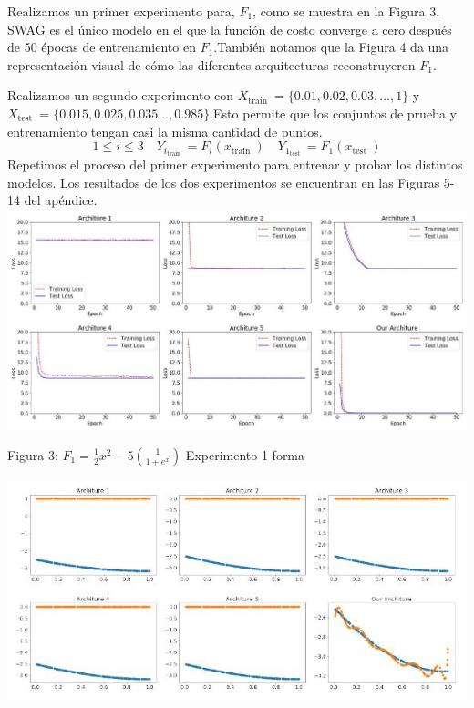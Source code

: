 \documentclass[10pt]{article}
\begin{document}
Realizamos un primer experimento para, $F_{1}$, como se muestra en la Figura 3. SWAG es el único modelo en el que la función de costo converge a cero después de 50 épocas de entrenamiento en $F_{1}$.También notamos que la Figura 4 da una representación visual de cómo las diferentes arquitecturas reconstruyeron $F_{1}$.

Realizamos un segundo experimento con $X_{\text {train }}=\{0.01,0.02,0.03, \ldots, 1\}$ y $X_{\text {test }}=\{0.015,0.025,0.035 \ldots, 0.985\}$.Esto permite que los conjuntos de prueba y entrenamiento tengan casi la misma cantidad de puntos.
$$
1 \leq i \leq 3 \quad Y_{i_{\text {train }}}=F_{i}\left(x_{\text {train }}\right) \quad Y_{1_{\text {test }}}=F_{1}\left(x_{\text {test }}\right)
$$
Repetimos el proceso del primer experimento para entrenar y probar los distintos modelos. Los resultados de los dos experimentos se encuentran en las Figuras 5-14 del apéndice.\\

\includegraphics[max width=\textwidth]{2022_09_28_0067ec14010042dbf918g-06}

Figura 3: $F_{1}=\frac{1}{2} x^{2}-5\left(\frac{1}{1+e^{x}}\right)$ Experimento 1 forma

\includegraphics[max width=\textwidth]{2022_09_28_0067ec14010042dbf918g-06(1)}
\end{document}
